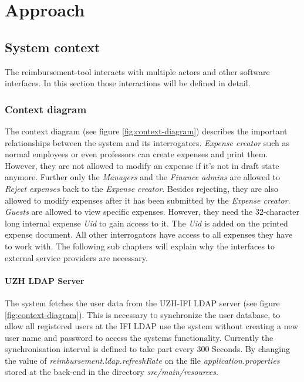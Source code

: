 \chapter{Approach}

\section{System context}

The reimbursement-tool interacts with multiple actors and other software interfaces. In this section those interactions will be defined in detail.

\subsection{Context diagram}

The context diagram (see figure \ref{fig:context-diagram}) describes the important relationships between the system and its interrogators. \textit{Expense creator} such as normal employees or even professors can create expenses and print them. However, they are not allowed to modify an expense if it's not in draft state anymore. Further only the \textit{Managers} and the \textit{Finance admins} are allowed to \textit{Reject expenses} back to the \textit{Expense creator}. Besides rejecting, they are also allowed to modify expenses after it has been submitted by the \textit{Expense creator}.\newline
\textit{Guests} are allowed to view specific expenses. However, they need the 32-character long internal expense \textit{Uid} to gain access to it. The \textit{Uid} is added on the printed expense document. All other interrogators have access to all expenses they have to work with.\newline
The following sub chapters will explain why the interfaces to external service providers are necessary.

\subsubsection{UZH LDAP Server}

The system fetches the user data from the UZH-IFI LDAP server (see figure \ref{fig:context-diagram}). This is necessary to synchronize the user database, to allow all registered users at the IFI LDAP use the system without creating a new user name and password to access the systems functionality. Currently the synchronisation interval is defined to take part every 300 Seconds. By changing the 
value of \textit{reimbursement.ldap.refreshRate} on the file \textit{application.properties} stored at the 
back-end in the directory \textit{src/main/resources}. 



